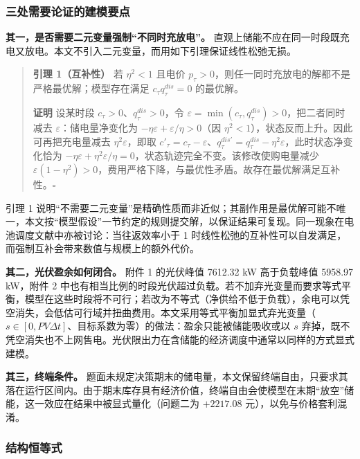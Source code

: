 \subsubsection{三处需要论证的建模要点}

\textbf{其一，是否需要二元变量强制“不同时充放电”。} 直观上储能不应在同一时段既充电又放电。本文不引入二元变量，而用如下引理保证线性松弛无损。

\begin{quote}
\textbf{引理 1（互补性）} 若 $\eta^2<1$ 且电价 $p_{\tau}>0$，则任一同时充放电的解都不是严格最优解；模型存在满足 $c_{\tau}q^{dis}_{\tau}=0$ 的最优解。

\textbf{证明} 设某时段 $c_{\tau}>0$、$q^{dis}_{\tau}>0$，令 $\varepsilon=\min(c_{\tau},q^{dis}_{\tau})>0$，把二者同时减去 $\varepsilon$：储电量净变化为 $-\eta\varepsilon+\varepsilon/\eta>0$（因 $\eta^2<1$），状态反而上升。因此可再把充电量减去 $\eta^2\varepsilon$，即取 $c'_{\tau}=c_{\tau}-\varepsilon$、$q^{dis\prime}_{\tau}=q^{dis}_{\tau}-\eta^2\varepsilon$，此时状态净变化恰为 $-\eta\varepsilon+\eta^2\varepsilon/\eta=0$，状态轨迹完全不变。该修改使购电量减少 $\varepsilon(1-\eta^2)>0$，费用严格下降，与最优性矛盾。故存在最优解满足互补性。$\square$
\end{quote}

引理 1 说明“不需要二元变量”是精确性质而非近似；其副作用是最优解可能不唯一，本文按“模型假设”一节约定的规则提交解，以保证结果可复现。同一现象在电池调度文献中亦被讨论：当往返效率小于 1 时线性松弛的互补性可以自发满足，而强制互补会带来数值与规模上的额外代价\cite{ref-wang-2024-complementarity,ref-nazir-2023-realizable-dispatch}。

\textbf{其二，光伏盈余如何闭合。} 附件 1 的光伏峰值 7612.32 kW 高于负载峰值 5958.97 kW，附件 2 中也有相当比例的时段光伏超过负载。若不加弃光变量而要求等式平衡，模型在这些时段将不可行；若改为不等式（净供给不低于负载），余电可以凭空消失，会低估可行域并扭曲费用。本文采用等式平衡加显式弃光变量（$s\in[0,PV\Delta t]$、目标系数为零）的做法：盈余只能被储能吸收或以 $s$ 弃掉，既不凭空消失也不上网售电。光伏限出力在含储能的经济调度中通常以同样的方式显式建模\cite{ref-grimaldi-2025-arbitrage-curtail,ref-qing-2025-pv-curtailment}。

\textbf{其三，终端条件。} 题面未规定决策期末的储电量，本文保留终端自由，只要求其落在运行区间内。由于期末库存具有经济价值，终端自由会使模型在末期“放空”储能，这一效应在结果中被显式量化（问题二为 $+2217.08$ 元），以免与价格套利混淆。

\subsubsection{结构恒等式}


